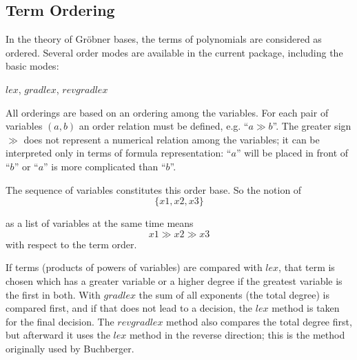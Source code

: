 \subsection{Term Ordering} \par
In the theory of Gr\"obner bases, the terms of polynomials are
considered as ordered. Several order modes are available in
the current package, including the basic modes:
 

\begin{center}
$lex$, $gradlex$, $revgradlex$
\end{center}

All orderings are based on an ordering among the variables. For
each pair of variables $(a,b)$ an order relation must be defined, e.g.
``$ a\gg b $''. The greater sign $\gg$  does not represent a numerical
relation among the variables; it can be interpreted only in terms of
formula representation: ``$a$'' will be placed in front of ``$b$'' or
``$a$''  is more complicated than ``$b$''.

The sequence of variables constitutes this order base. So the notion
of
\[ \{x1,x2,x3\} \]

as a list of variables at the same time means
\[ x1 \gg x2 \gg x3 \]
with respect to the term order.

If terms (products of powers of variables) are compared with $lex$,
that term is chosen which has a greater variable or a higher degree
if the greatest variable is the first in both. With $gradlex$ the sum of
all exponents (the total degree) is compared first, and if that does
not lead to a decision, the $lex$ method is taken for the final decision.
The $revgradlex$ method also compares the total degree first, but
afterward it uses the $lex$ method in the reverse direction; this is the
method originally used by Buchberger.

